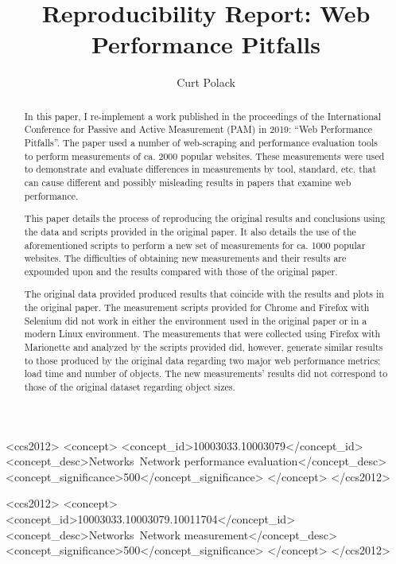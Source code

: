 \documentclass[sigconf]{acmart}
\begin{document}
\title{Reproducibility Report: Web Performance Pitfalls}

\author{Curt Polack}

\begin{abstract}
	In this paper, I re-implement a work published in the proceedings of the  International Conference for Passive and Active Measurement (PAM) in 2019: ``Web Performance Pitfalls''. The paper used a number of web-scraping and performance evaluation tools to perform measurements of ca. 2000 popular websites. These measurements were used to demonstrate and evaluate differences in measurements by tool, standard, etc. that can cause different and possibly misleading results in papers that examine web performance.
	
	This paper details the process of reproducing the original results and conclusions using the data and scripts provided in the original paper. It also details the use of the aforementioned scripts to perform a new set of measurements for ca. 1000 popular websites. The difficulties of obtaining new measurements and their results are expounded upon and the results compared with those of the original paper.
	
	The original data provided produced results that coincide with the results and plots in the original paper. The measurement scripts provided for Chrome and Firefox with Selenium did not work in either the environment used in the original paper or in a modern Linux environment. The measurements that were collected using Firefox with Marionette and analyzed by the scripts provided did, however, generate similar results to those produced by the original data regarding two major web performance metrics: load time and number of objects. The new measurements' results did not correspond to those of the original dataset regarding object sizes. 
\end{abstract}

\begin{CCSXML}
<ccs2012>
	<concept>
	<concept_id>10003033.10003079</concept_id>
	<concept_desc>Networks~Network performance evaluation</concept_desc>
	<concept_significance>500</concept_significance>
	</concept>
</ccs2012>
\end{CCSXML}

\begin{CCSXML}
<ccs2012>
	<concept>
	<concept_id>10003033.10003079.10011704</concept_id>
	<concept_desc>Networks~Network measurement</concept_desc>
	<concept_significance>500</concept_significance>
	</concept>
</ccs2012>
\end{CCSXML}
\end{document}
